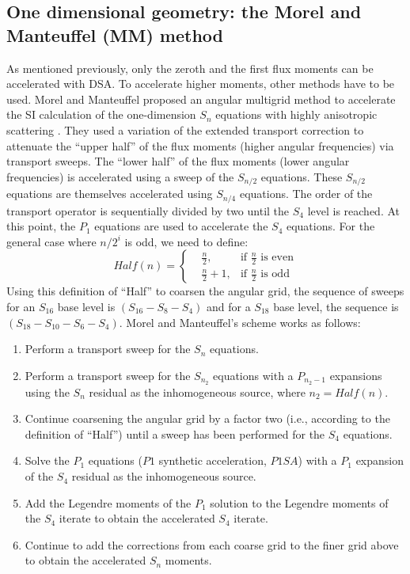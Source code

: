 \subsection{One dimensional geometry: the Morel and Manteuffel (MM) method}
As mentioned previously, only the zeroth and the first flux moments can be
accelerated with DSA. To accelerate higher moments, other methods have to be
used. Morel and Manteuffel proposed an angular multigrid method to accelerate
the SI calculation of the one-dimension $S_n$ equations with highly
anisotropic scattering \cite{multigrid_1d}. They used a variation of the
extended transport correction \cite{lathrop} to attenuate the ``upper half''
of the flux moments (higher angular frequencies) via transport sweeps. The
``lower half'' of the flux moments (lower angular frequencies) is accelerated
using a sweep of the $S_{n/2}$ equations. These $S_{n/2}$ equations are 
themselves accelerated using $S_{n/4}$ equations. The order of the transport 
operator is sequentially divided by two until the $S_4$ level is reached. At 
this point, the $P_1$ equations are used to accelerate the $S_4$ equations. For 
the general case where $n/2^i$ is odd, we need to define:
\begin{equation}
Half(n) = \left\{
\begin{aligned}
&\frac{n}{2}, &\textrm{if }\frac{n}{2}\textrm{ is even}\\
&\frac{n}{2}+1, &\textrm{if }\frac{n}{2}\textrm{ is odd}
\end{aligned}
\right.
\end{equation}
Using this definition of ``Half'' to coarsen the angular grid, the sequence of
sweeps for an $S_{16}$ base level is $(S_{16}-S_8-S_4)$ and for a $S_{18}$
base level, the sequence is $(S_{18}-S_{10}-S_6-S_4)$. Morel and Manteuffel's
scheme works as follows:
\begin{enumerate}
\item Perform a transport sweep for the $S_n$ equations.
\item Perform a transport sweep for the $S_{n_2}$ equations with a $P_{n_2-1}$
expansions using the $S_n$ residual as the inhomogeneous source, where
$n_2=Half(n)$.
\item Continue coarsening the angular grid by a factor two (i.e., according to
the definition of ``Half'') until a sweep has been performed for the $S_4$
equations.
\item Solve the $P_1$ equations ($P1$ synthetic acceleration, $P1SA$) with a
$P_1$ expansion of the $S_4$ residual as the inhomogeneous source.
\item Add the Legendre moments of the $P_1$ solution to the Legendre moments
of the $S_4$ iterate to obtain the accelerated $S_4$ iterate.
\item Continue to add the corrections from each coarse grid to the finer grid
above to obtain the accelerated $S_n$ moments.
\end{enumerate}
